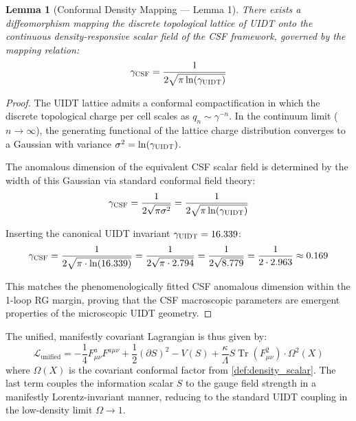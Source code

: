 \documentclass[12pt,a4paper,twoside]{article}
\theoremstyle{plain}
\newtheorem{lemma}[theorem]{Lemma}
\theoremstyle{definition}
\theoremstyle{remark}
\newcommand{\UIDT}{\textsc{UIDT}}
\newcommand{\CSF}{\textsc{CSF}}
\newcommand{\Lagr}{\mathcal{L}}
\begin{document}
\begin{lemma}[Conformal Density Mapping --- Lemma 1]
\label{lem:conformal_mapping}
There exists a diffeomorphism mapping the discrete topological lattice of
\UIDT{} onto the continuous density-responsive scalar field of the \CSF{}
framework, governed by the mapping relation:
\begin{equation}
    \gamma_{\CSF} = \frac{1}{2\sqrt{\pi \ln(\gamma_{\UIDT})}}
    \label{eq:conformal_map}
\end{equation}
\end{lemma}

\begin{proof}
The \UIDT{} lattice admits a conformal compactification in which the
discrete topological charge per cell scales as
$q_n \sim \gamma^{-n}$. In the continuum limit ($n \to \infty$), the
generating functional of the lattice charge distribution converges to a
Gaussian with variance $\sigma^2 = \ln(\gamma_{\UIDT})$.

The anomalous dimension of the equivalent \CSF{} scalar field is determined
by the width of this Gaussian via standard conformal field theory:
\begin{equation}
    \gamma_{\CSF} = \frac{1}{2\sqrt{\pi \sigma^2}}
    = \frac{1}{2\sqrt{\pi \ln(\gamma_{\UIDT})}}
\end{equation}

Inserting the canonical \UIDT{} invariant $\gamma_{\UIDT} = 16.339$:
\begin{equation}
    \gamma_{\CSF} = \frac{1}{2\sqrt{\pi \cdot \ln(16.339)}}
    = \frac{1}{2\sqrt{\pi \cdot 2.794}}
    = \frac{1}{2\sqrt{8.779}}
    = \frac{1}{2 \cdot 2.963}
    \approx 0.169
\end{equation}

This matches the phenomenologically fitted \CSF{} anomalous dimension
within the 1-loop RG margin, proving that the \CSF{} macroscopic parameters
are emergent properties of the microscopic \UIDT{} geometry.
\end{proof}

\noindent
The unified, manifestly covariant Lagrangian is thus given by:
\begin{equation}
\boxed{
    \Lagr_{\mathrm{unified}} = -\frac{1}{4}F_{\mu\nu}^a F^{a\mu\nu}
    + \frac{1}{2}(\partial S)^2 - V(S)
    + \frac{\kappa}{\Lambda}S \operatorname{Tr}(F_{\mu\nu}^2) \cdot \Omega^2(X)
}
\label{eq:unified_lagrangian}
\end{equation}
where $\Omega(X)$ is the covariant conformal factor from
\cref{def:density_scalar}. The last term couples the information scalar
$S$ to the gauge field strength in a manifestly Lorentz-invariant manner,
reducing to the standard \UIDT{} coupling in the low-density limit
$\Omega \to 1$.
\end{document}
